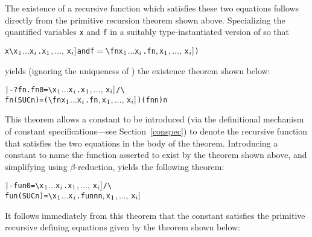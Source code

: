{The existence  of  a  recursive  function   which  satisfies these two
equations follows directly from the primitive recursion theorem
 shown above.   Specializing the  quantified variables \verb!x!
and \verb!f!  in  a suitably  type-instantiated version  of  so
that

\begin{hol}\begin{alltt}
   x\m{=}\verb!\!x\(\sb{1}\) \(\dots\) x\(\sb{i}\).\m{f\sb{1}[}x\(\sb{1}\)\(,\ldots,\,\)x\(\sb{i}]\)  {\rm and}  f\(=\)\verb!\!f n x\(\sb{1}\) \(\dots\) x\(\sb{i}\).\m{f\sb{2}[}f  n\(,\) x\(\sb{1}\)\(,\ldots,\,\)x\(\sb{i}]\))
\end{alltt}\end{hol}

\noindent yields (ignoring the uniqueness of ) the existence theorem shown below:

\begin{hol}\begin{alltt}
   |- ?fn. fn 0       = \verb!\!x\(\sb{1}\) \(\dots\) x\(\sb{i}\).\m{f\sb{1}[}x\(\sb{1}\)\(,\ldots,\,\)x\(\sb{i}]\) /\verb!\!
           fn (SUC n) = (\verb!\!f n x\(\sb{1}\) \(\dots\) x\(\sb{i}\).\m{f\sb{2}[}f  n\(,\) x\(\sb{1}\)\(,\ldots,\,\)x\(\sb{i}]\)) (fn n) n
\end{alltt}\end{hol}

\noindent This theorem allows a constant  to be introduced (via the
definitional mechanism of constant specifications---see Section~\ref{conspec})
to denote the recursive function that satisfies the two equations in the body
of the theorem. Introducing a constant  to name the function asserted
to exist by the theorem shown above, and simplifying using $\beta$-reduction,
yields the following theorem:

\begin{hol}\begin{alltt}
   |- fun 0       = \verb!\!x\(\sb{1}\) \(\dots\) x\(\sb{i}\).\m{f\sb{1}[}x\(\sb{1}\)\(,\ldots,\,\)x\(\sb{i}]\) /\verb!\!
      fun (SUC n) = \verb!\!x\(\sb{1}\) \(\dots\) x\(\sb{i}\).\m{f\sb{2}[}fun n  n\(,\) x\(\sb{1}\)\(,\ldots,\,\)x\(\sb{i}]\)
\end{alltt}\end{hol}

\noindent It follows immediately from this theorem that the constant 
satisfies the primitive recursive defining equations given by the theorem shown
below:

}
